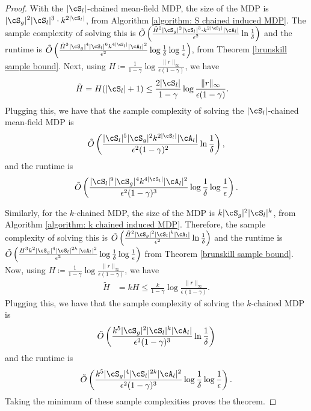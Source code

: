 \documentclass{article}
\theoremstyle{plain}
\theoremstyle{definition}
\begin{document}
\begin{proof}
    With the $|\cS_l|$-chained mean-field MDP, the size of the MDP is $|\cS_g|^2|\cS_l|^3\cdot k^{2|\cS_l|}$, from Algorithm \ref{algorithm: S chained induced MDP}. The sample complexity of solving this is $\tilde{O}\left(\frac{\tilde{H}^2 |\cS_g|^2|\cS_l|^3\cdot k^{2|\cS_l|} |\cA_l|}{\epsilon^2} \ln \frac1\delta\right)$
    and the runtime is  $\tilde{O}\left(\frac{\tilde{H}^3 |\cS_g|^4  |\cS_l|^6 k^{4|\cS_l|}|\cA_l|^2}{\epsilon^2} \log \frac1\delta \log \frac1\epsilon\right)$,
    from Theorem \ref{brunskill sample bound}.  Next, using $H \coloneqq \frac{1}{1-\gamma}\log \frac{\|r\|_\infty}{\epsilon(1-\gamma)}$, we have
    \begin{align*} 
    \tilde{H} &= H(|\cS_l|+1) \leq \frac{2|\cS_l|}{1-\gamma}\log \frac{\|r\|_\infty}{\epsilon(1-\gamma)}.
    \end{align*}
    Plugging this, we have that the sample complexity of solving the $|\cS_l|$-chained mean-field MDP is 
    \[\tilde{O}\left(\frac{|\cS_l|^5|\cS_g|^2 k^{2|\cS_l|}|\cA_l|}{\epsilon^2(1-\gamma)^2}\ln \frac1\delta\right),\]
    and the runtime is
    \begin{align*}\tilde{O}\left(\frac{|\cS_l|^9 |\cS_g|^4  k^{4|\cS_l|}|\cA_l|^2}{\epsilon^2(1-\gamma)^3} \log \frac1\delta \log \frac1\epsilon \right).
    \end{align*}

     Similarly, for the $k$-chained MDP, the size of the MDP is $k |\cS_g|^2|\cS_l|^k$, from Algorithm \ref{algorithm: k chained induced MDP}. Therefore, the sample complexity of solving this is $\tilde{O}\left(\frac{ \tilde{H}^2 |\cS_g|^2 |\cS_l|^k |\cA_l|}{\epsilon^2} \ln \frac1\delta\right)$ and the runtime is $\tilde{O}\left(\frac{H^3 k^2  |\cS_g|^4 |\cS_l|^{2k}|\cA_l|^2}{\epsilon^2} \log \frac1\delta \log \frac1\epsilon\right)$ from Theorem \ref{brunskill sample bound}.  Now, using $H\coloneqq \frac{1}{1-\gamma}\log \frac{\|r\|_\infty}{\epsilon(1-\gamma)}$, we have
     \begin{align*}\tilde{H} &= kH  \leq \frac{k}{1-\gamma} \log \frac{\|r\|_\infty}{\epsilon(1-\gamma)}.\end{align*}
     Plugging this, we have that the sample complexity of solving the $k$-chained MDP is \[\tilde{O}\left(\frac{k^5  |\cS_g|^2 |\cS_l|^k |\cA_l|}{\epsilon^2(1-\gamma)^3} \ln \frac1\delta\right)\] and the runtime is \[\tilde{O}\left(\frac{k^5  |\cS_g|^4 |\cS_l|^{2k}|\cA_l|^2}{\epsilon^2(1-\gamma)^3} \log \frac1\delta \log \frac1\epsilon\right).\]
     Taking the minimum of these sample complexities proves the theorem.\qedhere
\end{proof}
\end{document}
